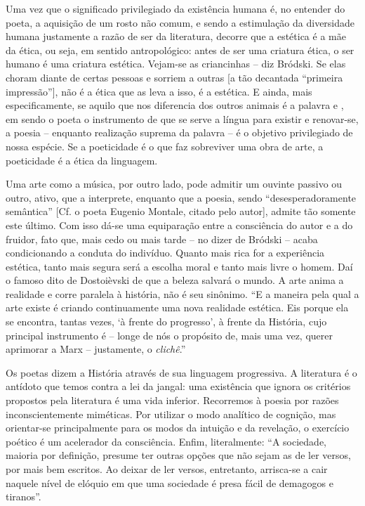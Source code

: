 Uma vez que o significado privilegiado da existência humana é, no
entender do poeta, a aquisição de um rosto não comum, e sendo a
estimulação da diversidade humana justamente a razão de ser da
literatura, decorre que a estética é a mãe da ética, ou seja, em sentido
antropológico: antes de ser uma criatura ética, o ser humano é uma
criatura estética. Vejam-se as criancinhas -- diz Bródski. Se elas
choram diante de certas pessoas e sorriem a outras {[}a tão decantada
``primeira impressão''{]}, não é a ética que as leva a isso, é a
estética. E ainda, mais especificamente, se aquilo que nos diferencia
dos outros animais é a palavra e , em sendo o poeta o instrumento de que
se serve a língua para existir e renovar-se, a poesia -- enquanto
realização suprema da palavra -- é o objetivo privilegiado de nossa
espécie. Se a poeticidade é o que faz sobreviver uma obra de arte, a
poeticidade é a ética da linguagem.

Uma arte como a música, por outro lado, pode admitir um ouvinte passivo
ou outro, ativo, que a interprete, enquanto que a poesia, sendo
``desesperadoramente semântica'' {[}Cf. o poeta Eugenio Montale, citado
pelo autor{]}, admite tão somente este último. Com isso dá-se uma
equiparação entre a consciência do autor e a do fruidor, fato que, mais
cedo ou mais tarde -- no dizer de Bródski -- acaba condicionando a
conduta do indivíduo. Quanto mais rica for a experiência estética, tanto
mais segura será a escolha moral e tanto mais livre o homem. Daí o
famoso dito de Dostoièvski de que a beleza salvará o mundo. A arte anima
a realidade e corre paralela à história, não é seu sinônimo. ``E a
maneira pela qual a arte existe é criando continuamente uma nova
realidade estética. Eis porque ela se encontra, tantas vezes, `à frente
do progresso', à frente da História, cujo principal instrumento é --
longe de nós o propósito de, mais uma vez, querer aprimorar a Marx --
justamente, o \emph{clichê}.''

Os poetas dizem a História através de sua linguagem progressiva. A
literatura é o antídoto que temos contra a lei da jangal: uma existência
que ignora os critérios propostos pela literatura é uma vida inferior.
Recorremos à poesia por razões inconscientemente miméticas. Por utilizar
o modo analítico de cognição, mas orientar-se principalmente para os
modos da intuição e da revelação, o exercício poético é um acelerador da
consciência. Enfim, literalmente: ``A sociedade, maioria por definição,
presume ter outras opções que não sejam as de ler versos, por mais bem
escritos. Ao deixar de ler versos, entretanto, arrisca-se a cair naquele
nível de elóquio em que uma sociedade é presa fácil de demagogos e
tiranos''.

